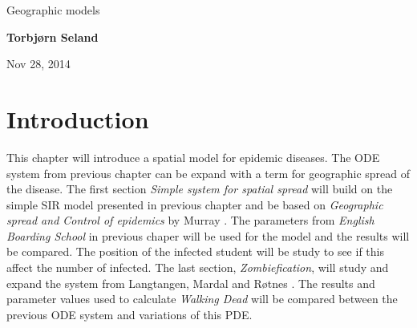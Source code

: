 \documentclass[%
twoside,                 %
final,                   %
10pt]{article}
\begin{document}




\thispagestyle{empty}

\begin{center}
{\LARGE\bf
\begin{spacing}{1.25}
Geographic models 
\end{spacing}
}
\end{center}


\begin{center}
{\bf Torbjørn Seland${}^{}$} \\ [0mm]
\end{center}

    \begin{center}
\end{center}


\begin{center}
Nov 28, 2014
\end{center}

\vspace{1cm}


\tableofcontents


\vspace{1cm} %




\section{Introduction}
This chapter will introduce a spatial model for epidemic diseases. The ODE system from previous chapter can be expand with a term for geographic spread of the disease. The first section \emph{Simple system for spatial spread} will build on the simple SIR model presented in previous chapter and be based on \emph{Geographic spread and Control of epidemics} by Murray \cite{murray2003mathematical}. The parameters from \emph{English Boarding School} in previous chaper will be used for the model and the results will be compared. The position of the infected student will be study to see if this affect the number of infected. The last section, \emph{Zombiefication}, will study and expand the system from Langtangen, Mardal and Røtnes \cite{zombie-math}. The results and parameter values used to calculate \emph{Walking Dead} will be compared between the previous ODE system and variations of this PDE. 
\end{document}
